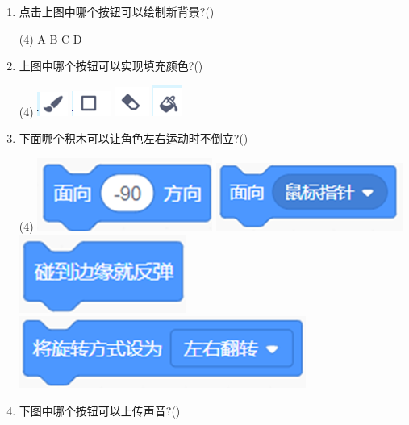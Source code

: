 \documentclass[10.5pt, a4paper]{article}
\begin{document}
\begin{enumerate}
        \item 点击上图中哪个按钮可以绘制新背景?(\qquad)
        \begin{tasks}(4)
            \task A
            \task B
            \task C
            \task D
        \end{tasks}

        \item 上图中哪个按钮可以实现填充颜色?(\qquad)
        \begin{tasks}(4)
            \task \includegraphics[width=.05\textwidth]{21a.png}
            \task \includegraphics[width=.05\textwidth]{21b.png}
            \task \includegraphics[width=.05\textwidth]{21c.png}
            \task \includegraphics[width=.05\textwidth]{21d.png}
        \end{tasks}

        \item 下面哪个积木可以让角色左右运动时不倒立?(\qquad)
        \begin{tasks}(4)
            \task \includegraphics[width=.12\textwidth]{22a.png}
            \task \includegraphics[width=.15\textwidth]{22b.png}
            \task \includegraphics[width=.12\textwidth]{22c.png}
            \task \includegraphics[width=.18\textwidth]{22d.png}
        \end{tasks}

        \item 下图中哪个按钮可以上传声音?(\qquad)
        

\end{enumerate}
\end{document}

